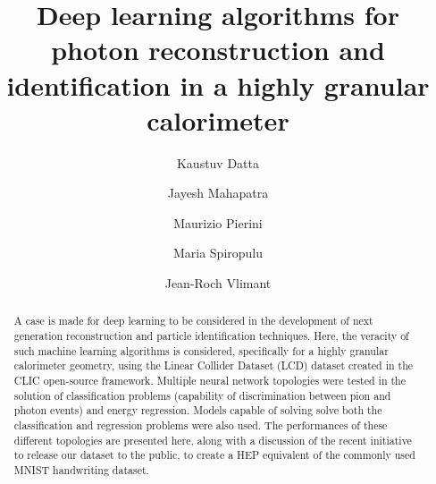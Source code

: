 \documentclass[twocolumn,aps,prd,reprint,superscriptaddress]{revtex4-1}
\begin{document}
	\graphicspath{{KaustuvDatta/}}
	
	\title{Deep learning algorithms for photon reconstruction and identification in a highly granular calorimeter}
	\author{Kaustuv Datta}
	
	\author{Jayesh Mahapatra}
	
	\author{Maurizio Pierini}
	
	\author{Maria Spiropulu}
	
	\author{Jean-Roch Vlimant}

	
	\begin{abstract}
		A case is made for deep learning to be considered in the development of next generation reconstruction and particle identification techniques. Here, the veracity of such machine learning algorithms is considered, specifically for a highly granular calorimeter geometry, using the Linear Collider Dataset (LCD) dataset created in the CLIC open-source framework. Multiple neural network topologies were tested in the solution of classification problems (capability of discrimination between pion and photon events) and energy regression. Models capable of solving solve both the classification and regression problems were also used. The performances of these different topologies are presented here, along with a discussion of the recent initiative to release our dataset to the public, to create a HEP equivalent of the commonly used MNIST handwriting dataset. 
	\end{abstract}
	\maketitle
	
	
\end{document}
